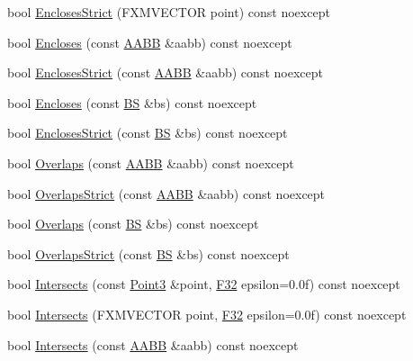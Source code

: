 \begin{DoxyCompactItemize}
\item 
bool \hyperlink{structmage_1_1_view_frustum_a9eaa1d0fcb7e896ff13e2bc7603d613c}{Encloses\+Strict} (F\+X\+M\+V\+E\+C\+T\+OR point) const noexcept
\item 
bool \hyperlink{structmage_1_1_view_frustum_ad9bffbf0a041452888559db4a4ed5f48}{Encloses} (const \hyperlink{structmage_1_1_a_a_b_b}{A\+A\+BB} \&aabb) const noexcept
\item 
bool \hyperlink{structmage_1_1_view_frustum_a7a0d293c4f3d1f29c54f45f00a7ca51f}{Encloses\+Strict} (const \hyperlink{structmage_1_1_a_a_b_b}{A\+A\+BB} \&aabb) const noexcept
\item 
bool \hyperlink{structmage_1_1_view_frustum_a779328d61928c60bfc0290d85eb79e4c}{Encloses} (const \hyperlink{structmage_1_1_b_s}{BS} \&bs) const noexcept
\item 
bool \hyperlink{structmage_1_1_view_frustum_a4300cf7690bc650ca521283496394997}{Encloses\+Strict} (const \hyperlink{structmage_1_1_b_s}{BS} \&bs) const noexcept
\item 
bool \hyperlink{structmage_1_1_view_frustum_a35c0afb66692cfd26a0e9bee2065892e}{Overlaps} (const \hyperlink{structmage_1_1_a_a_b_b}{A\+A\+BB} \&aabb) const noexcept
\item 
bool \hyperlink{structmage_1_1_view_frustum_a2eef224e458509eada25ec91a53753c6}{Overlaps\+Strict} (const \hyperlink{structmage_1_1_a_a_b_b}{A\+A\+BB} \&aabb) const noexcept
\item 
bool \hyperlink{structmage_1_1_view_frustum_ad7b492eaad1a93e650a8477045d5c0cb}{Overlaps} (const \hyperlink{structmage_1_1_b_s}{BS} \&bs) const noexcept
\item 
bool \hyperlink{structmage_1_1_view_frustum_a05963d6685c8cafc22be50c8e9b405df}{Overlaps\+Strict} (const \hyperlink{structmage_1_1_b_s}{BS} \&bs) const noexcept
\item 
bool \hyperlink{structmage_1_1_view_frustum_a7baa179995540134bced232579de7fc7}{Intersects} (const \hyperlink{structmage_1_1_point3}{Point3} \&point, \hyperlink{namespacemage_aa97e833b45f06d60a0a9c4fc22ae02c0}{F32} epsilon=0.\+0f) const noexcept
\item 
bool \hyperlink{structmage_1_1_view_frustum_a621efc234e605682e3ea5d98683e9a9e}{Intersects} (F\+X\+M\+V\+E\+C\+T\+OR point, \hyperlink{namespacemage_aa97e833b45f06d60a0a9c4fc22ae02c0}{F32} epsilon=0.\+0f) const noexcept
\item 
bool \hyperlink{structmage_1_1_view_frustum_a222e185f69a78f3c363423618f0a506d}{Intersects} (const \hyperlink{structmage_1_1_a_a_b_b}{A\+A\+BB} \&aabb) const noexcept

\end{DoxyCompactItemize}

